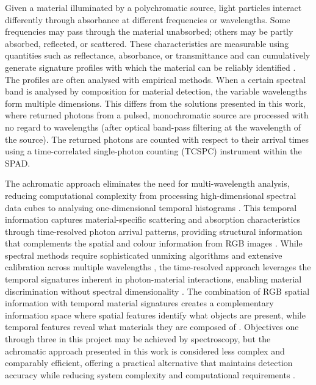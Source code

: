 \documentclass[12pt,a4paper,oneside]{report}
\begin{document}
Given a material illuminated by a polychromatic source, light particles interact differently through absorbance at different frequencies or wavelengths. Some frequencies may pass through the material unabsorbed; others may be partly absorbed, reflected, or scattered. These characteristics are measurable using quantities such as reflectance, absorbance, or transmittance and can cumulatively generate signature profiles with which the material can be reliably identified \cite{jungerman2022,becker2023}. The profiles are often analysed with empirical methods. When a certain spectral band is analysed by composition for material detection, the variable wavelengths form multiple dimensions. This differs from the solutions presented in this work, where returned photons from a pulsed, monochromatic source are processed with no regard to wavelengths (after optical band-pass filtering at the wavelength of the source). The returned photons are counted with respect to their arrival times using a time-correlated single-photon counting (TCSPC) instrument within the SPAD.

The achromatic approach eliminates the need for multi-wavelength analysis, reducing computational complexity from processing high-dimensional spectral data cubes to analysing one-dimensional temporal histograms \cite{su2016,becker2023,tafone2023}. This temporal information captures material-specific scattering and absorption characteristics through time-resolved photon arrival patterns, providing structural information that complements the spatial and colour information from RGB images \cite{jungerman2022,su2016}. While spectral methods require sophisticated unmixing algorithms and extensive calibration across multiple wavelengths \cite{heinz2001,vasile2023}, the time-resolved approach leverages the temporal signatures inherent in photon-material interactions, enabling material discrimination without spectral dimensionality \cite{su2016,becker2023,tafone2023}. The combination of RGB spatial information with temporal material signatures creates a complementary information space where spatial features identify what objects are present, while temporal features reveal what materials they are composed of \cite{yang2023,yang2024,gadzicki2020}. Objectives one through three in this project may be achieved by spectroscopy, but the achromatic approach presented in this work is considered less complex and comparably efficient, offering a practical alternative that maintains detection accuracy while reducing system complexity and computational requirements \cite{su2016,becker2023,tafone2023}.
\end{document}
